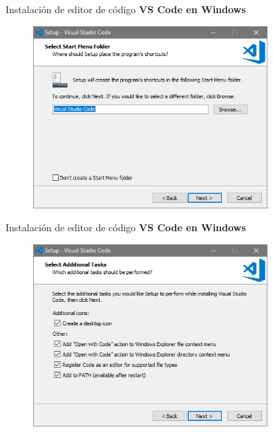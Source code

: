 \begin{frame}[fragile]{Instalación de editor de código}
  \textbf{VS Code en Windows}
   \begin{figure}
     \includegraphics[width=0.8\textwidth]{./resources/VSCODE_Step_04.PNG}
   \end{figure}
\end{frame}

\begin{frame}[fragile]{Instalación de editor de código}
  \textbf{VS Code en Windows}
   \begin{figure}
     \includegraphics[width=0.8\textwidth]{./resources/VSCODE_Step_05.PNG}
   \end{figure}
\end{frame}

